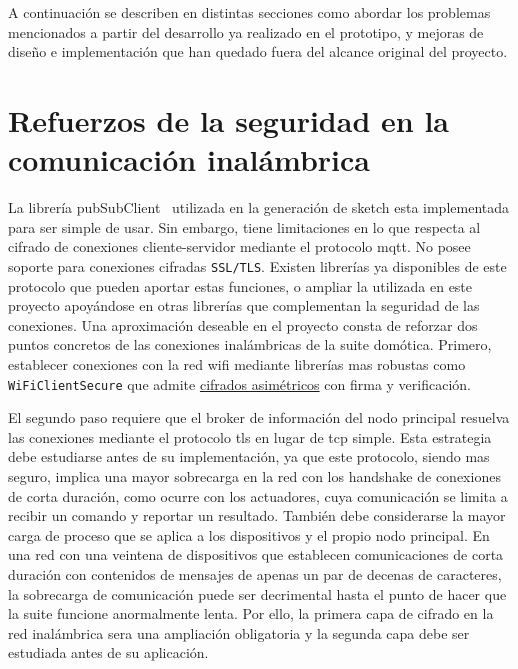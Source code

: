 \vspace{1cm}

A continuación se describen en distintas secciones como abordar los problemas mencionados a partir del desarrollo ya realizado en el prototipo, y mejoras de diseño e implementación que han quedado fuera del alcance original del proyecto.

\section{Refuerzos de la seguridad en la comunicación inalámbrica}
\label{ch:Capitulo6.1}
La librería pubSubClient~\cite{pubsubclientapi} utilizada en la generación de \gls{sketch} esta implementada para ser simple de usar. Sin embargo, tiene limitaciones en lo que respecta al cifrado de conexiones cliente-servidor mediante el protocolo \gls{mqtt}. No posee soporte para conexiones cifradas \verb|SSL/TLS|. Existen librerías ya disponibles de este protocolo que pueden aportar estas funciones, o ampliar la utilizada en este proyecto apoyándose en otras librerías que complementan la seguridad de las conexiones. Una aproximación deseable en el proyecto consta de reforzar dos puntos concretos de las conexiones inalámbricas de la suite domótica. Primero, establecer conexiones con la red \gls{wifi} mediante librerías mas robustas como \verb|WiFiClientSecure| que admite \href{https://arduino-esp8266.readthedocs.io/en/latest/esp8266wifi/client-secure-class.html}{cifrados asimétricos} con firma y verificación. 

\vspace{1cm}

El segundo paso requiere que el \gls{broker} de información del nodo principal resuelva las conexiones mediante el protocolo \gls{tls} en lugar de \gls{tcp} simple. Esta estrategia debe estudiarse antes de su implementación, ya que este protocolo, siendo mas seguro, implica una mayor sobrecarga en la red con los \gls{handshake} de conexiones de corta duración, como ocurre con los actuadores, cuya comunicación se limita a recibir un comando y reportar un resultado. También debe considerarse la mayor carga de proceso que se aplica a los dispositivos y el propio nodo principal. En una red con una veintena de dispositivos que establecen comunicaciones de corta duración con contenidos de mensajes de apenas un par de decenas de caracteres, la sobrecarga de comunicación puede ser decrimental hasta el punto de hacer que la suite funcione anormalmente lenta. Por ello, la primera capa de cifrado en la red inalámbrica sera una ampliación obligatoria y la segunda capa debe ser estudiada antes de su aplicación.

